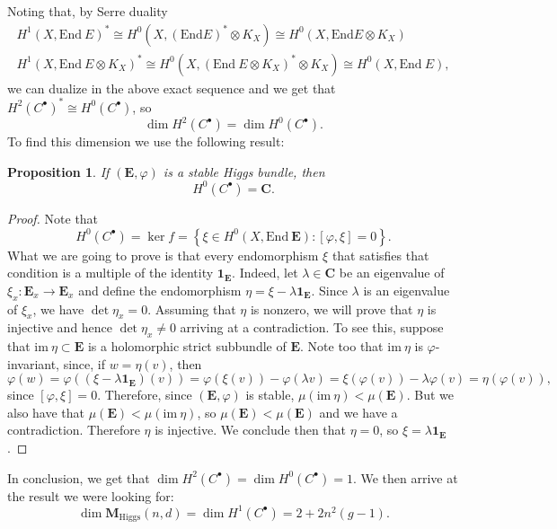 \documentclass[12pt,a4paper]{book}
\newtheorem{prop}[thm]{Proposition}
\theoremstyle{definition} \newtheorem{defn}[thm]{Definition}
\theoremstyle{definition} \newtheorem{ejemplo}[thm]{Example}
\theoremstyle{remark} \newtheorem{rem}[thm]{Remark}
\def\CC{\mathbf{C}}
\def\id{\mathbf{1}}
\def\im{\mathrm{im}\ }
\def\End{\mathrm{End}}
\def\Hig{\mathbf{M}_{\mathrm{Higgs}}}
\newcommand{\ve}[1]{\mathbf{#1}}
\begin{document}
	      Noting that, by Serre duality
	      \begin{align*}
		H^1(X,\End\ E)^*\cong H^0(X,(\End E)^* \otimes K_X) \cong H^0(X,\End E \otimes K_X) \\
		H^1(X,\End\ E \otimes K_X)^* \cong H^0(X,(\End\ E \otimes K_X)^*\otimes K_X) \cong H^0(X, \End\ E),
	      \end{align*}
	      we can dualize in the above exact sequence and we get that $H^2(C^\bullet)^*\cong H^0(C^\bullet)$, so $$\dim H^2(C^\bullet)=\dim H^0(C^\bullet).$$ 
	      To find this dimension we use the following result:
	      \begin{prop}
		If $(\ve{E},\varphi)$ is a stable Higgs bundle, then 
		\begin{equation*}
		  H^0(C^\bullet) = \CC.
		\end{equation*}
	      \end{prop}
	      \begin{proof}
	Note that 
	\begin{equation*}
	  H^0(C^\bullet)=\ker f = \left\{ \xi \in H^0(X,\End\ \ve{E}): [\varphi,\xi]=0 \right\}.
	\end{equation*}
	What we are going to prove is that every endomorphism $\xi$ that satisfies that condition is a multiple of the identity $\id_{\ve{E}}$. Indeed, let $\lambda \in \CC$ be an eigenvalue of $\xi_x:\ve{E}_x \rightarrow \ve{E}_x$ and define the endomorphism $\eta= \xi-\lambda \id_{\ve{E}}$. Since $\lambda$ is an eigenvalue of $\xi_x$, we have $\det \eta_x=0$. Assuming that $\eta$ is nonzero, we will prove that $\eta$ is injective and hence $\det \eta_x \neq 0$ arriving at a contradiction. To see this, suppose that $\im \eta \subset \ve{E}$ is a holomorphic strict subbundle of $\ve{E}$. Note too that $\im \eta$ is $\varphi$-invariant, since, if $w=\eta(v)$, then $$\varphi(w)=\varphi((\xi - \lambda \id_{\ve{E}})(v))= \varphi(\xi(v)) -  \varphi(\lambda v)=\xi(\varphi(v))-\lambda \varphi(v)=\eta(\varphi(v)),$$
	since $[\varphi,\xi]=0$. Therefore, since $(\ve{E},\varphi)$ is stable, $\mu(\im \eta) < \mu(\ve{E})$. But we also have that $\mu(\ve{E})<\mu(\im \eta)$, so $\mu(\ve{E})<\mu(\ve{E})$ and we have a contradiction. Therefore $\eta$ is injective. We conclude then that $\eta=0$, so $\xi=\lambda \id_{\ve{E}}$.
	      \end{proof}

	      In conclusion, we get that $\dim H^2(C^\bullet)=\dim H^0(C^\bullet)=1$. We then arrive at the result we were looking for:
	      \begin{equation*}
		\dim \Hig(n,d)=\dim H^1(C^\bullet)=2+2n^2(g-1).
	      \end{equation*}
\end{document}
